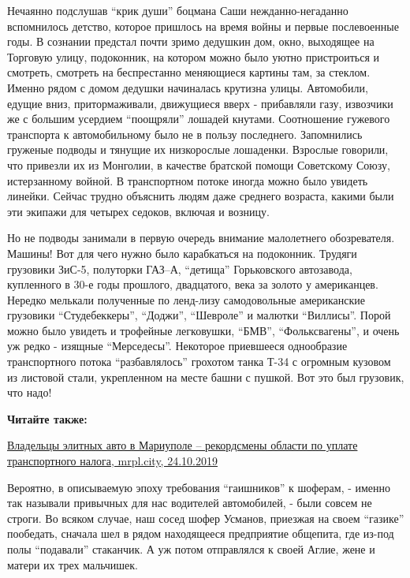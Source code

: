 Нечаянно подслушав \enquote{крик души} боцмана Саши нежданно-негаданно вспомнилось
детство, которое пришлось на время войны и первые послевоенные годы. В сознании
предстал почти зримо дедушкин дом, окно, выходящее на Торговую улицу,
подоконник, на котором можно было уютно пристроиться и смотреть, смотреть на
беспрестанно меняющиеся картины там, за стеклом. Именно рядом с домом дедушки
начиналась крутизна улицы. Автомобили, едущие вниз, притормаживали, движущиеся
вверх - прибавляли газу, извозчики же с большим усердием \enquote{поощряли} лошадей
кнутами. Соотношение гужевого транспорта к автомобильному было не в пользу
последнего. Запомнились груженые подводы и тянущие их низкорослые лошаденки.
Взрослые говорили, что привезли их из Монголии, в качестве братской помощи
Советскому Союзу, истерзанному войной. В транспортном потоке иногда можно было
увидеть линейки. Сейчас трудно объяснить людям даже среднего возраста, какими
были эти экипажи для четырех седоков, включая и возницу.

Но не подводы занимали в первую очередь внимание малолетнего обозревателя.
Машины! Вот для чего нужно было карабкаться на подоконник. Трудяги грузовики
ЗиС-5, полуторки ГАЗ–А, \enquote{детища} Горьковского автозавода, купленного в 30-е
годы прошлого, двадцатого, века за золото у американцев. Нередко мелькали
полученные по ленд-лизу самодовольные американские грузовики \enquote{Студебеккеры},
\enquote{Доджи}, \enquote{Шевроле} и малютки \enquote{Виллисы}. Порой можно было увидеть и трофейные
легковушки, \enquote{БМВ}, \enquote{Фольксвагены}, и очень уж редко - изящные \enquote{Мерседесы}.
Некоторое приевшееся однообразие транспортного потока \enquote{разбавлялось} грохотом
танка Т-34 с огромным кузовом из листовой стали, укрепленном на месте башни с
пушкой. Вот это был грузовик, что надо!

\textbf{Читайте также:}

\href{https://mrpl.city/news/view/vladeltsy-e-litnyh-avto-v-mariupolerekordsmeny-oblasti-po-uplate-transportnogo-naloga}{Владельцы элитных авто в Мариуполе – рекордсмены области по уплате транспортного налога, mrpl.city, 24.10.2019}

Вероятно, в описываемую эпоху требования \enquote{гаишников} к шоферам, - именно так
называли привычных для нас водителей автомобилей, - были совсем не строги. Во
всяком случае, наш сосед шофер Усманов, приезжая на своем \enquote{газике} пообедать,
сначала шел в рядом находящееся предприятие общепита, где из-под полы
\enquote{подавали} стаканчик. А уж потом отправлялся к своей Аглие, жене и матери их
трех мальчишек.

